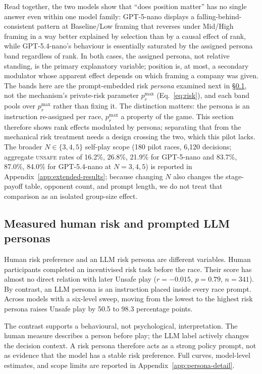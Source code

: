 \documentclass[sigconf]{aamas}
\newcommand{\Unsafe}{\textsc{unsafe}}
\begin{document}
Read together, the two models show that ``does position matter'' has
no single answer even within one model family: GPT-5-nano displays a
falling-behind-consistent pattern at Baseline/Low framing that reverses
under Mid/High framing in a way better explained by selection than by a
causal effect of rank, while GPT-5.4-nano's behaviour is essentially
saturated by the assigned persona band regardless of rank. In both cases,
the assigned persona, not relative standing, is the primary
explanatory variable; position is, at most, a secondary modulator whose
apparent effect depends on which framing a company was given. The bands
here are the prompt-embedded risk \emph{persona} examined next in
\S\ref{sec:results-persona}, not the mechanism's private-risk parameter
$p_r^{\max}$ (Eq.~\ref{eq:risk}), and each band pools over $p_r^{\max}$
rather than fixing it. The distinction matters: the persona is an
instruction re-assigned per race, $p_r^{\max}$ a property of the game. This
section therefore shows rank effects modulated by persona; separating that
from the mechanical risk treatment needs a design crossing the two, which
this pilot lacks. The broader
$N\in\{3,4,5\}$ self-play scope (180 pilot races, 6,120 decisions;
aggregate \Unsafe{} rates of 16.2\%, 26.8\%, 21.9\% for GPT-5-nano and
83.7\%, 87.0\%, 84.0\% for GPT-5.4-nano at $N=3,4,5$) is reported in
Appendix~\ref{app:extended-results}; because changing $N$ also changes the
stage-payoff table, opponent count, and prompt length, we do not treat
that comparison as an isolated group-size effect.

\subsection{Measured human risk and prompted LLM personas}
\label{sec:results-persona}

Human risk preference and an LLM risk persona are different variables. Human
participants completed an incentivised risk task before the race. Their score
has almost no direct relation with later Unsafe play ($r=-0.015$, $p=0.79$,
$n=341$). By contrast, an LLM persona is an instruction placed inside every
race prompt. Across models with a six-level sweep, moving from the lowest to
the highest risk persona raises Unsafe play by 50.5 to 98.3 percentage points.

The contrast supports a behavioural, not psychological, interpretation. The
human measure describes a person before play; the LLM label actively changes
the decision context. A risk persona therefore acts as a strong policy prompt,
not as evidence that the model has a stable risk preference. Full curves,
model-level estimates, and scope limits are reported in
Appendix~\ref{app:persona-detail}.
\end{document}
